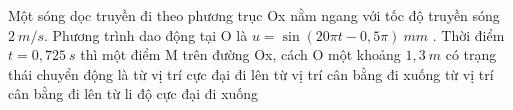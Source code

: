 	\begin{ex}%
		Một sóng dọc truyền đi theo phương trục Ox nằm ngang với tốc độ truyền sóng $2\ m/s$. Phương trình dao động tại O là $u=\sin \left( 20\pi t-0,5\pi \right)\ mm$ . Thời điểm $t = 0,725\ s$ thì một điểm M trên đường Ox, cách O một khoảng $1,3\ m$ có trạng thái chuyển động là
		\choice
		{từ vị trí cực đại đi lên}
		{\True từ vị trí cân bằng đi xuống}
		{từ vị trí cân bằng đi lên}
		{từ li độ cực đại đi xuống}
	\end{ex}
	
